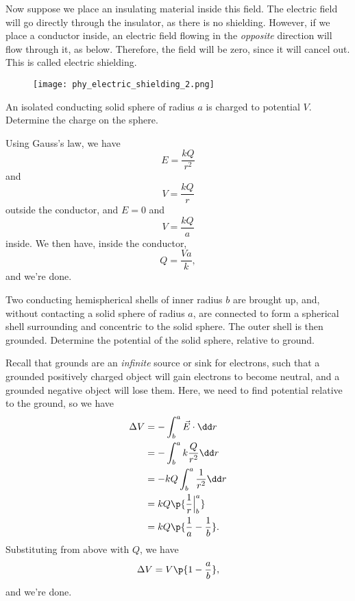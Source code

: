 \documentclass[11pt]{article}
\begin{document}
Now suppose we place an insulating material inside this field. The electric field will go directly through the insulator, as there is no shielding. However, if we place a conductor inside, an electric field flowing in the \textit{opposite} direction will flow through it, as below. Therefore, the field will be zero, since it will cancel out. This is called electric shielding.
\begin{figure}[H]
    \centering
    \texttt{[image: phy\_electric\_shielding\_2.png]}
\end{figure}
\begin{example}[AP 1988]
    An isolated conducting solid sphere of radius $a$ is charged to potential $V$. Determine the charge on the sphere.
\end{example}
\begin{solution}
    Using Gauss's law, we have
    \[E = \frac{kQ}{r^2}\]
    and \[V = \frac{kQ}{r}\] outside the conductor, and $E = 0$ and \[V = \frac{kQ}{a}\] inside. We then have, inside the conductor, \[Q = \frac{Va}{k},\]
    and we're done.
\end{solution}
\begin{example}
    Two conducting hemispherical shells of inner radius $b$ are brought up, and, without contacting a solid sphere of radius $a$, are connected to form a spherical shell surrounding and concentric to the solid sphere. The outer shell is then grounded. Determine the potential of the solid sphere, relative to ground.
\end{example}
\begin{solution}
    Recall that grounds are an \textit{infinite} source or sink for electrons, such that a grounded positively charged object will gain electrons to become neutral, and a grounded negative object will lose them. Here, we need to find potential relative to the ground, so we have
    \begin{align*}
        \Delta V &= -\int_b^a\vec{E}\cdot\dd r \\
        &= -\int_{b}^a k\frac{Q}{r^2}\dd r \\
        &= -kQ\int_b^a \frac{1}{r^2} \dd r \\
        &= kQ\p{\frac{1}{r}\Big|_{b}^a} \\
        &= kQ\p{\frac{1}{a}-\frac{1}{b}}.
    \end{align*}
    Substituting from above with $Q$, we have
    \[\Delta V = V\p{1-\frac{a}{b}},\]
    and we're done.
\end{solution}
\end{document}
